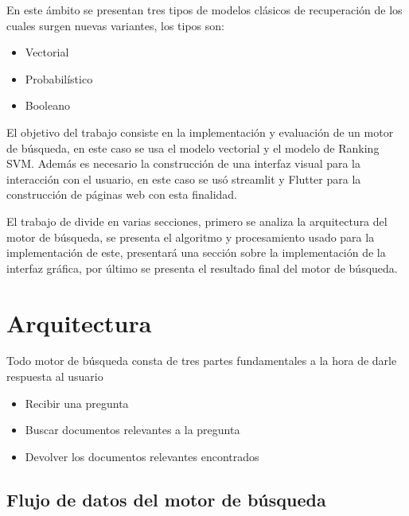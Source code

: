 \documentclass[runningheads]{llncs}
\begin{document}
En este ámbito se presentan tres tipos de modelos clásicos de recuperación de los
cuales surgen nuevas variantes, los tipos son:

\begin{itemize}
    \item Vectorial
    \item Probabilístico
    \item Booleano
\end{itemize}

El objetivo del trabajo consiste en la implementación y evaluación de un motor de búsqueda,
en este caso se usa el modelo vectorial y el modelo de Ranking SVM. Además es necesario la
construcción de una interfaz visual para la interacción con el usuario, en este caso se usó
streamlit y Flutter para la construcción de páginas web con esta finalidad.

El trabajo de divide en varias secciones, primero se analiza la arquitectura del motor de
búsqueda, se presenta el algoritmo y procesamiento usado para la implementación de 
este, presentará una sección sobre la implementación de la interfaz gráfica, por último
se presenta el resultado final del motor de búsqueda.

\section{Arquitectura}

Todo motor de búsqueda consta de tres partes fundamentales a la hora de darle respuesta al usuario

\begin{itemize}
    \item Recibir una pregunta
    \item Buscar documentos relevantes a la pregunta
    \item Devolver los documentos relevantes encontrados
\end{itemize}

\subsection{Flujo de datos del motor de búsqueda}
\end{document}
